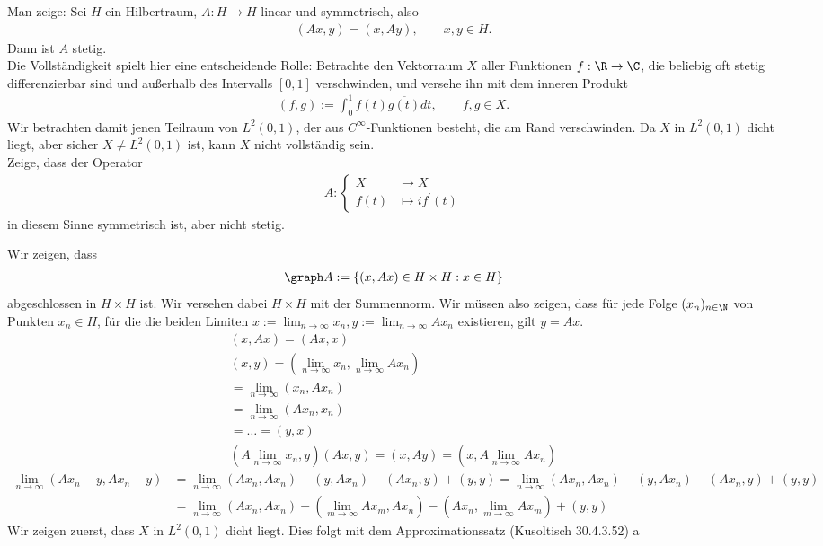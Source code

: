 \begin{exercise}
Man zeige: Sei $H$ ein Hilbertraum, $A: H \to H$ linear und symmetrisch, also
\begin{align*}
  (Ax,y) = (x,Ay), \qquad x,y \in H.
\end{align*}
Dann ist $A$ stetig. \\
Die Vollständigkeit spielt hier eine entscheidende Rolle: Betrachte den Vektorraum $X$
aller Funktionen $f: \R \to \C$, die beliebig oft stetig differenzierbar sind und
außerhalb des Intervalls $[0,1]$ verschwinden, und versehe ihn mit dem inneren Produkt
\begin{align*}
  (f,g) := \int_0^1 f(t)\overline{g(t)}dt, \qquad f,g \in X.
\end{align*}
Wir betrachten damit jenen Teilraum von $L^2(0,1)$, der aus $C^{\infty}$-Funktionen
besteht, die am Rand verschwinden. Da $X$ in $L^2(0,1)$ dicht liegt, aber sicher
$X \neq L^2(0,1)$ ist, kann $X$ nicht vollständig sein. \\
Zeige, dass der Operator
\begin{align*}
  A: \begin{cases}
    X &\to X \\
    f(t) &\mapsto if^{\prime}(t)
  \end{cases}
\end{align*}
in diesem Sinne symmetrisch ist, aber nicht stetig.
\end{exercise}
\begin{solution}
Wir zeigen, dass
\begin{align*}
  \graph A := \{(x,Ax) \in H \times H: x \in H\}
\end{align*}
abgeschlossen in $H \times H$ ist. Wir versehen dabei $H \times H$ mit der Summennorm.
Wir müssen also zeigen, dass für jede
Folge $(x_n)_{n \in \N}$ von Punkten $x_n \in H$, für die die beiden Limiten
$x := \lim_{n \to \infty} x_n, y:= \lim_{n \to \infty} Ax_n$ existieren, gilt $y = Ax$.
\begin{align*}
    (x,Ax) = (Ax,x) \\
    (x,y) = (\lim_{n \to \infty} x_n, \lim_{n \to \infty} Ax_n) \\
    = \lim_{n \to \infty}(x_n, Ax_n) \\
    =\lim_{n \to \infty}(Ax_n, x_n) \\
    = \dots = (y,x) \\
   (A\lim_{n \to \infty} x_n, y)(Ax,y) = (x,Ay) = (x, A\lim_{n \to \infty} Ax_n)
\end{align*}
\begin{align*}
  \lim_{n \to \infty} (Ax_n - y,Ax_n -y)
  &= \lim_{n \to \infty} (Ax_n,Ax_n) - (y,Ax_n) - (Ax_n,y) +(y,y)
  = \lim_{n \to \infty} (Ax_n,Ax_n) - (y,Ax_n) - (Ax_n,y) +(y,y) \\
  &= \lim_{n \to \infty} (Ax_n,Ax_n) - (\lim_{m \to \infty} Ax_m,Ax_n) - (Ax_n,\lim_{m \to \infty} Ax_m) +(y,y)
\end{align*}
Wir zeigen zuerst, dass $X$ in $L^2(0,1)$ dicht liegt. Dies folgt mit dem
Approximationssatz (Kusoltisch 30.4.3.52)
a\end{solution}
